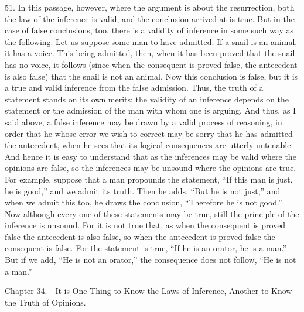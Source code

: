 51. In this passage, however, where the argument is about the resurrection, both the law of the inference is valid, and the conclusion arrived at is true. But in the case of false conclusions, too, there is a validity of inference in some such way as the following. Let us suppose some man to have admitted: If a snail is an animal, it has a voice. This being admitted, then, when it has been proved that the snail has no voice, it follows (since when the consequent is proved false, the antecedent is also false) that the snail is not an animal. Now this conclusion is false, but it is a true and valid inference from the false admission. Thus, the truth of a statement stands on its own merits; the validity of an inference depends on the statement or the admission of the man with whom one is arguing. And thus, as I said above, a false inference may be drawn by a valid process of reasoning, in order that he whose error we wish to correct may be sorry that he has admitted the antecedent, when he sees that its logical consequences are utterly untenable. And hence it is easy to understand that as the inferences may be valid where the opinions are false, so the inferences may be unsound where the opinions are true. For example, suppose that a man propounds the statement, “If this man is just, he is good,” and we admit its truth. Then he adds, “But he is not just;” and when we admit this too, he draws the conclusion, “Therefore he is not good.” Now although every one of these  statements may be true, still the principle of the inference is unsound. For it is not true that, as when the consequent is proved false the antecedent is also false, so when the antecedent is proved false the consequent is false. For the statement is true, “If he is an orator, he is a man.” But if we add, “He is not an orator,” the consequence does not follow, “He is not a man.”


Chapter 34.—It is One Thing to Know the Laws of Inference, Another to Know the Truth of Opinions.

